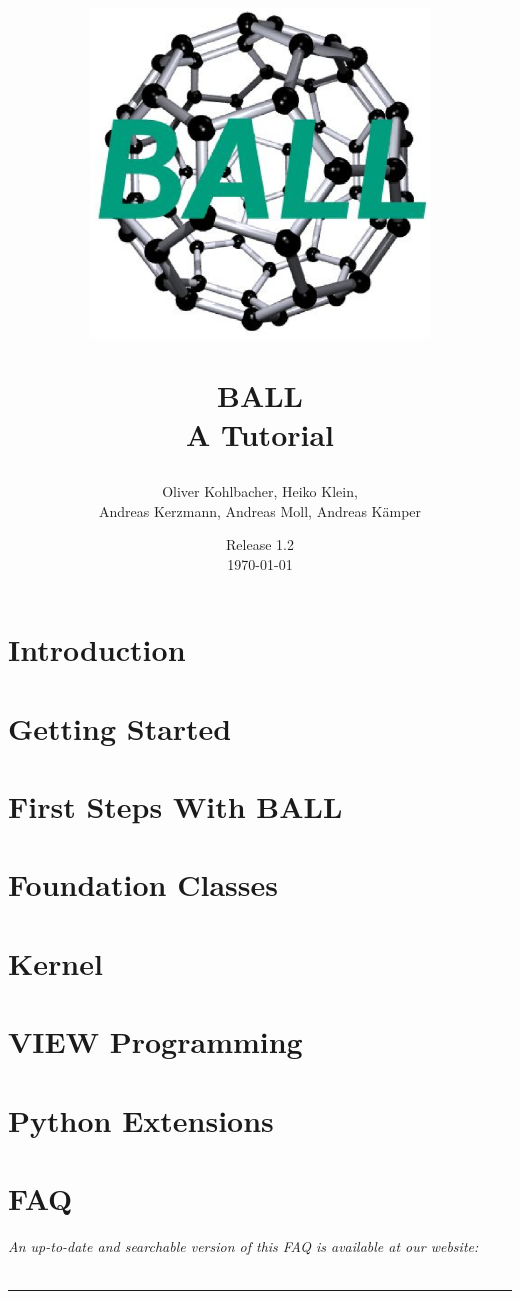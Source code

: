 \documentclass[12pt,twoside]{report}
\author{
  Oliver Kohlbacher, Heiko Klein,\\
  Andreas Kerzmann, Andreas Moll, Andreas K\"{a}mper
}
\title{
  \begin{center}
    \includegraphics[width=9cm]{logo.eps}
  \end{center}
  \Huge BALL\\ 
  \Large A Tutorial
}
\date{
  Release 1.2\\
  \today
}
\begin{document}
\setlength{\headheight}{14.5pt}
\setcounter{page}{1}
\maketitle
\cleardoublepage

\tableofcontents
\clearpage

\setcounter{page}{1}


\chapter{Introduction}
\label{chapter:introduction}



\chapter{Getting Started}
\label{chapter:getting-started}




\chapter{First Steps With BALL}
\label{chapter:first-steps}




\chapter{Foundation Classes}
\label{chapter:foundation-classes}




\chapter{Kernel}
\label{chapter:kernel}


\chapter{VIEW Programming}
\label{chapter:view-programming}


\chapter{Python Extensions}
\label{chapter:python}


\chapter{FAQ}
\label{chapter:faq}
\newpage
\noindent
{\it An up-to-date and searchable version of this FAQ is available at our 
website:\\
}\\
\hspace{1mm}
\rule{\textwidth}{0.1pt}
\hspace{3mm}

\end{document}
